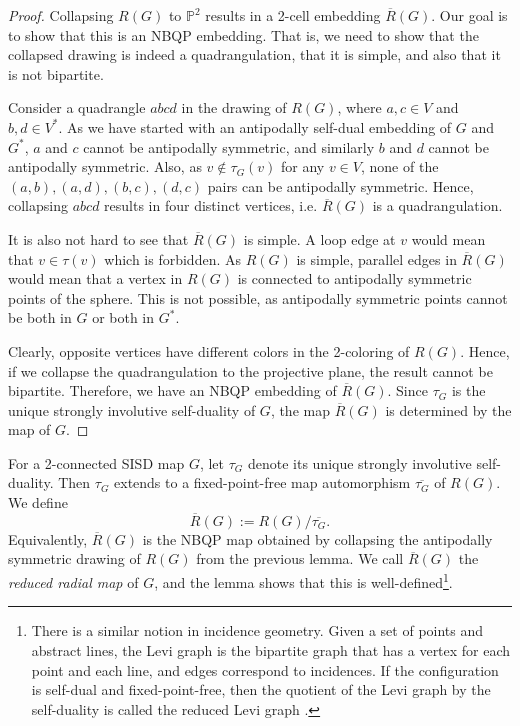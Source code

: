 \documentclass[10pt,a4paper]{article}
\newcommand{\Pb}[0]{\mathbb{P}}
\begin{document}
\begin{proof}
 Collapsing $R(G)$ to $\Pb^2$ results in a 2-cell embedding  $\overline R(G)$. Our goal is to show that this is an NBQP embedding. That is, we need to show that the collapsed drawing is indeed a quadrangulation, that it is simple, and also that it is not bipartite. 
 
 Consider a quadrangle $abcd$ in the drawing of $R(G)$, where $a,c\in V$ and $b,d\in V^*$. As we have started with an antipodally self-dual embedding of $G$ and $G^*$, $a$ and $c$ cannot be antipodally symmetric, and similarly $b$ and $d$ cannot be antipodally symmetric.   
  Also, as $v\notin \tau_G(v)$ for any $v\in V $, none of the $(a,b), (a,d),(b,c),(d,c)$ pairs can be antipodally symmetric. Hence, collapsing $abcd$ results in four distinct vertices, i.e. $\overline R(G)$ is a quadrangulation.  
  
  It is also not hard to see that $\overline R(G)$ is simple. A loop edge at $v$ would mean that $v\in \tau(v)$ which is forbidden. As $R(G)$ is simple, parallel edges in $\overline R(G)$ would mean that a vertex in $R(G)$ is connected to antipodally symmetric points of the sphere. This is not possible, as antipodally symmetric points cannot be both in $G$ or both in $G^*$.
 
 Clearly, opposite vertices have different colors in the 2-coloring of $R(G)$. Hence, if we collapse the quadrangulation to the projective plane, the result cannot be bipartite. Therefore, we have an NBQP embedding of $\overline R(G)$. Since $\tau_G$ is the unique strongly involutive self-duality of $G$, the map $\overline R(G)$ is determined by the map of $G$.
    
\end{proof}

For a 2-connected SISD map $G$, let $\tau_G$ denote its unique strongly involutive self-duality. Then $\tau_G$ extends to a fixed-point-free map automorphism $\overline{\tau_G}$ of $R(G)$.  We define\[\overline R(G):=R(G)/\overline{\tau_G}.\] Equivalently, $\overline R(G)$ is the NBQP map obtained by collapsing the antipodally symmetric drawing of $R(G)$ from the previous lemma. We call $\overline R(G)$ the \emph{reduced radial map} of $G$, and the lemma shows that this is well-defined\footnote{There is a similar notion in incidence geometry. Given a set of points and abstract lines, the Levi graph is the bipartite graph that has a vertex for each point and each line, and edges correspond to incidences. If the configuration is self-dual and fixed-point-free, then the quotient of the Levi graph by the self-duality is called the reduced Levi graph \cite{artzy1956}.}.
\end{document}

